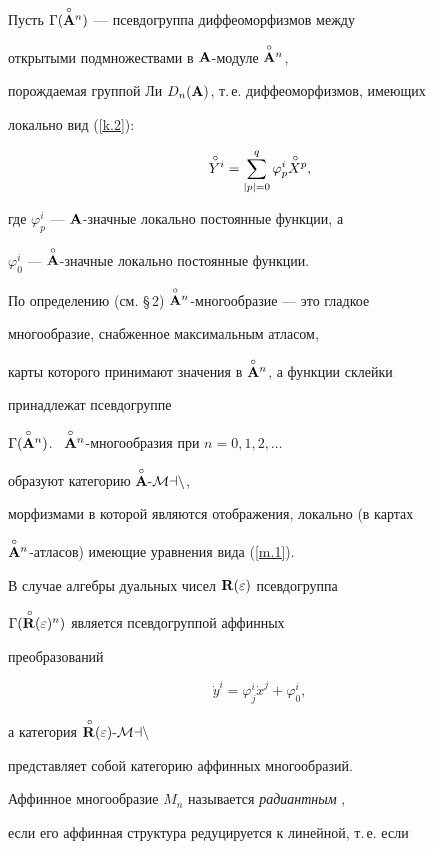 Пусть ${\Gamma(\overset{\circ}{\bold A}{}^n)}$ --- псевдогруппа диффеоморфизмов между


открытыми подмножествами в  ${\bold A}$-модуле $\overset{\circ}{\bold A}{}^n$,


порождаемая группой Ли $D_n({\bold A})$, т.\,е. диффеоморфизмов, имеющих


локально  вид (\ref{k.2}):


\begin{equation}


{\puto Y}{}^i=\sum^q_{|p|=0}\varphi^i_p{\puto X}{}^p,


\label{m.1}


\end{equation}


где $\varphi^i_p$ --- ${\bold A}$-значные локально постоянные функции, а


$\varphi^i_0$ --- $\overset{\circ}{\bold A}{}$-значные локально постоянные функции.


По определению (см. \S\,2) $\overset{\circ}{\bold A}{}^n$-многообразие --- это гладкое


многообразие, снабженное максимальным атласом,


карты которого принимают значения в $\overset{\circ}{\bold A}{}^n$, а функции склейки 


принадлежат псевдогруппе 


${\Gamma(\overset{\circ}{\bold A}{}^n)}$. \ $\overset{\circ}{\bold A}{}^n$-многообразия при $n=0,1,2,\dotsc$ 


образуют категорию ${\overset{\circ}{\bold A}{}}\text{-}\cal M an$,


морфизмами в которой являются отображения, локально (в картах


$\overset{\circ}{\bold A}{}^n$-атласов) имеющие уравнения вида (\ref{m.1}).





В случае алгебры дуальных чисел ${\bold R}(\varepsilon)$ псевдогруппа


$\Gamma(\overset{\,\circ}{{\bold R}}{}(\varepsilon)^n)$ является псевдогруппой аффинных


преобразований


$$


\Dot y^i=\varphi^i_j\Dot x^j+\varphi^i_0,


$$


а категория ${\overset{\,\circ}{{\bold R}}{}}(\varepsilon)\text{-}\cal M an$


представляет собой категорию аффинных многообразий.


Аффинное многообразие $M_n$ называется {\it радиантным} \cite{G-H},


если его аффинная структура редуцируется к линейной, т.\,е. если


